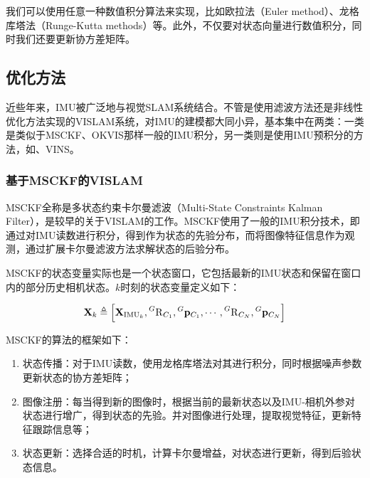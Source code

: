 我们可以使用任意一种数值积分算法来实现，比如欧拉法（Euler method）、龙格库塔法（Runge-Kutta methods）\citep{wiki2017runge}等。此外，不仅要对状态向量进行数值积分，同时我们还要更新协方差矩阵。

\subsection{优化方法}

近些年来，IMU被广泛地与视觉SLAM系统结合。不管是使用滤波方法还是非线性优化方法实现的VISLAM系统，对IMU的建模都大同小异，基本集中在两类：一类是类似于MSCKF\citep{mourikis2007multi}、OKVIS\citep{leutenegger2015keyframe}那样一般的IMU积分，另一类则是使用IMU预积分的方法，如\citep{forster2017manifold}、VINS\citep{li2017monocular}。

\subsubsection*{基于MSCKF的VISLAM}

MSCKF全称是多状态约束卡尔曼滤波（Multi-State Constraints Kalman Filter），是较早的关于VISLAM的工作。MSCKF使用了一般的IMU积分技术，即通过对IMU读数进行积分，得到作为状态的先验分布，而将图像特征信息作为观测，通过扩展卡尔曼滤波方法求解状态的后验分布。

MSCKF的状态变量实际也是一个状态窗口，它包括最新的IMU状态和保留在窗口内的部分历史相机状态。$k$时刻的状态变量定义如下：

\begin{equation}
    \mathbf{X}_k \triangleq
    \left[
        \mathbf{X}_{\textrm{IMU}_k},
        \prescript{G}{}{\mathrm R}_{C_1},
        \prescript{G}{}{\mathbf p}_{C_1},
        \cdots,
        \prescript{G}{}{\mathrm R}_{C_N},
        \prescript{G}{}{\mathbf p}_{C_N}
    \right]
\end{equation}

MSCKF的算法的框架如下：

\begin{enumerate}
    \item 状态传播：对于IMU读数，使用龙格库塔法对其进行积分，同时根据噪声参数更新状态的协方差矩阵；
    \item 图像注册：每当得到新的图像时，根据当前的最新状态以及IMU-相机外参对状态进行增广，得到状态的先验。并对图像进行处理，提取视觉特征，更新特征跟踪信息等；
    \item 状态更新：选择合适的时机，计算卡尔曼增益，对状态进行更新，得到后验状态信息。
\end{enumerate}

